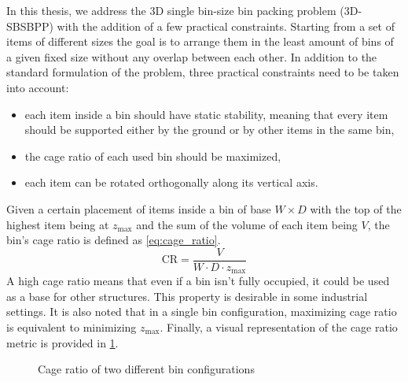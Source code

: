 In this thesis, we address the 3D single bin-size bin packing problem (3D-SBSBPP) with the addition of a few practical constraints. Starting from a set of items of different sizes the goal is to arrange them in the least amount of bins of a given fixed size without any overlap between each other.
In addition to the standard formulation of the problem, three practical constraints need to be taken into account:
\begin{itemize}
    \item each item inside a bin should have static stability, meaning that every item should be supported either by the ground or by other items in the same bin,
    \item the cage ratio of each used bin should be maximized,
    \item each item can be rotated orthogonally along its vertical axis.
\end{itemize}

Given a certain placement of items inside a bin of base $W \times D$ with the top of the highest item being at $z_\text{max}$ and the sum of the volume of each item being $V$, the bin's cage ratio is defined as \cref{eq:cage_ratio}.
\begin{equation}
    \label{eq:cage_ratio}
    \text{CR} = \frac{V}{W \cdot D \cdot z_\text{max}}
\end{equation}
A high cage ratio means that even if a bin isn't fully occupied, it could be used as a base for other structures. This property is desirable in some industrial settings.
It is also noted that in a single bin configuration, maximizing cage ratio is equivalent to minimizing $z_\text{max}$. Finally, a visual representation of the cage ratio metric is provided in \cref{fig:cage_ratio}.

\begin{figure}[H]
    \scalebox{0.60}{%
    
    }
    \caption{Cage ratio of two different bin configurations}
    \label{fig:cage_ratio}
\end{figure}

